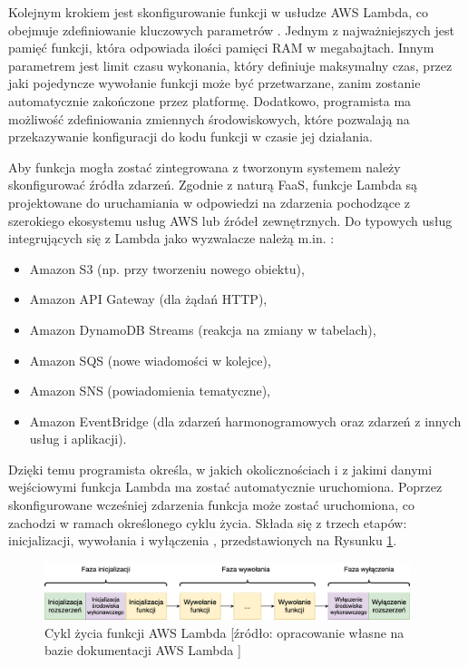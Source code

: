 Kolejnym krokiem jest skonfigurowanie funkcji w usłudze AWS Lambda, co obejmuje zdefiniowanie kluczowych parametrów \cite{awsLambdaDocs}.
Jednym z najważniejszych jest pamięć funkcji, która odpowiada ilości pamięci RAM w megabajtach.
Innym parametrem jest limit czasu wykonania, który definiuje maksymalny czas, przez jaki pojedyncze wywołanie funkcji może być przetwarzane, zanim zostanie automatycznie zakończone przez platformę. 
Dodatkowo, programista ma możliwość zdefiniowania zmiennych środowiskowych, które pozwalają na przekazywanie konfiguracji do kodu funkcji w czasie jej działania.

Aby funkcja mogła zostać zintegrowana z tworzonym systemem należy skonfigurować źródła zdarzeń.
Zgodnie z naturą FaaS, funkcje Lambda są projektowane do uruchamiania w odpowiedzi na zdarzenia pochodzące z szerokiego ekosystemu usług AWS lub źródeł zewnętrznych.
Do typowych usług integrujących się z Lambda jako wyzwalacze należą m.in. \cite{awsLambdaDocs}:
\begin{itemize}
    \item Amazon S3 (np. przy tworzeniu nowego obiektu),
    \item Amazon API Gateway (dla żądań HTTP),
    \item Amazon DynamoDB Streams (reakcja na zmiany w tabelach),
    \item Amazon SQS (nowe wiadomości w kolejce),
    \item Amazon SNS (powiadomienia tematyczne),
    \item Amazon EventBridge (dla zdarzeń harmonogramowych oraz zdarzeń z innych usług i aplikacji).
\end{itemize}
Dzięki temu programista określa, w jakich okolicznościach i z jakimi danymi wejściowymi funkcja Lambda ma zostać automatycznie uruchomiona.
Poprzez skonfigurowane wcześniej zdarzenia funkcja może zostać uruchomiona, co zachodzi w ramach określonego cyklu życia.
Składa się z trzech etapów: inicjalizacji, wywołania i wyłączenia \cite{awsLambdaDocs}, przedstawionych na Rysunku \ref{fig:aws_lambda_lifecycle}.

\begin{figure}[h]
    \centering
    \includegraphics[width=0.95\textwidth]{charts/aws_lambda_lifecycle.drawio.png}
    \caption{Cykl życia funkcji AWS Lambda [źródło: opracowanie własne na bazie dokumentacji AWS Lambda \cite{awsLambdaDocs}]}
    \label{fig:aws_lambda_lifecycle}    
\end{figure}


